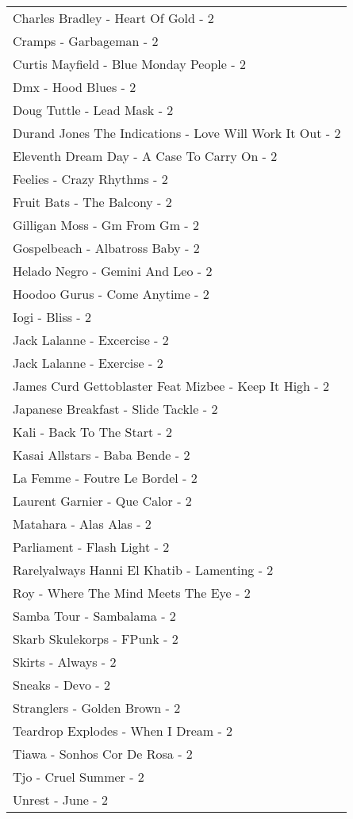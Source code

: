 \documentclass[
]{article}
\begin{document}
\begin{longtable}{l}
Charles Bradley - Heart Of Gold - 2 \\ 
Cramps - Garbageman - 2 \\ 
Curtis Mayfield - Blue Monday People - 2 \\ 
Dmx - Hood Blues - 2 \\ 
Doug Tuttle - Lead Mask - 2 \\ 
Durand Jones The Indications - Love Will Work It Out - 2 \\ 
Eleventh Dream Day - A Case To Carry On - 2 \\ 
Feelies - Crazy Rhythms - 2 \\ 
Fruit Bats - The Balcony - 2 \\ 
Gilligan Moss - Gm From Gm - 2 \\ 
Gospelbeach - Albatross Baby - 2 \\ 
Helado Negro - Gemini And Leo - 2 \\ 
Hoodoo Gurus - Come Anytime - 2 \\ 
Iogi - Bliss - 2 \\ 
Jack Lalanne - Excercise - 2 \\ 
Jack Lalanne - Exercise - 2 \\ 
James Curd Gettoblaster Feat Mizbee - Keep It High - 2 \\ 
Japanese Breakfast - Slide Tackle - 2 \\ 
Kali - Back To The Start - 2 \\ 
Kasai Allstars - Baba Bende - 2 \\ 
La Femme - Foutre Le Bordel - 2 \\ 
Laurent Garnier - Que Calor - 2 \\ 
Matahara - Alas Alas - 2 \\ 
Parliament - Flash Light - 2 \\ 
Rarelyalways Hanni El Khatib - Lamenting - 2 \\ 
Roy - Where The Mind Meets The Eye - 2 \\ 
Samba Tour - Sambalama - 2 \\ 
Skarb Skulekorps - FPunk - 2 \\ 
Skirts - Always - 2 \\ 
Sneaks - Devo - 2 \\ 
Stranglers - Golden Brown - 2 \\ 
Teardrop Explodes - When I Dream - 2 \\ 
Tiawa - Sonhos Cor De Rosa - 2 \\ 
Tjo - Cruel Summer - 2 \\ 
Unrest - June - 2 \\ 

\end{longtable}
\end{document}
